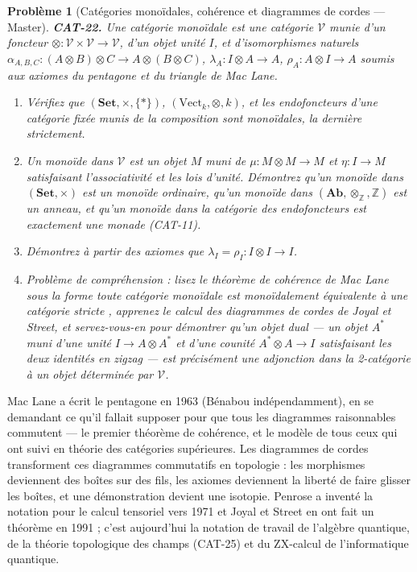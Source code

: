 \documentclass[11pt]{article}
\newtheorem{problem}{Problème}
\begin{document}
\begin{problem}[{Catégories monoïdales, cohérence et diagrammes de cordes --- Master}]
\textbf{CAT-22.} Une \textit{catégorie monoïdale} est une catégorie $ \mathcal{V} $ munie d'un
foncteur $ \otimes\colon \mathcal{V} \times \mathcal{V} \to \mathcal{V} $, d'un objet unité
$ I $, et d'isomorphismes naturels
$ \alpha_{A,B,C}\colon (A \otimes B) \otimes C \to A \otimes (B \otimes C) $,
$ \lambda_A\colon I \otimes A \to A $, $ \rho_A\colon A \otimes I \to A $ soumis aux axiomes
du pentagone et du triangle de Mac Lane.
\begin{enumerate}
\item[(a)] Vérifiez que $ (\mathbf{Set}, \times, \{*\}) $, $ (\mathrm{Vect}_k, \otimes, k) $, et
les endofoncteurs d'une catégorie fixée munis de la composition sont monoïdales, la dernière
strictement.
\item[(b)] Un \textit{monoïde} dans $ \mathcal{V} $ est un objet $ M $ muni de
$ \mu\colon M \otimes M \to M $ et $ \eta\colon I \to M $ satisfaisant l'associativité et les
lois d'unité. Démontrez qu'un monoïde dans $ (\mathbf{Set}, \times) $ est un monoïde ordinaire,
qu'un monoïde dans
$ (\mathbf{Ab}, \otimes_{\mathbb{Z}}, \mathbb{Z}) $ est un anneau, et qu'un monoïde dans la
catégorie des endofoncteurs est exactement une monade (CAT-11).
\item[(c)] Démontrez à partir des axiomes que $ \lambda_I = \rho_I\colon I \otimes I \to I $.
\item[(d)] Problème de compréhension : lisez le théorème de cohérence de Mac Lane sous la forme \og{} toute
catégorie monoïdale est monoïdalement équivalente à une catégorie stricte \fg{}, apprenez le calcul
des diagrammes de cordes de Joyal et Street, et servez-vous-en pour démontrer qu'un objet dual ---
un objet $ A^{*} $ muni d'une unité $ I \to A \otimes A^{*} $ et d'une counité
$ A^{*} \otimes A \to I $ satisfaisant les deux identités en zigzag --- est précisément une
adjonction dans la 2-catégorie à un objet déterminée par $ \mathcal{V} $.
\end{enumerate}

\end{problem}

\noindent Mac Lane a écrit le pentagone en 1963 (Bénabou indépendamment), en se demandant
ce qu'il fallait supposer pour que \og{} tous les diagrammes raisonnables commutent \fg{} --- le premier
théorème de cohérence, et le modèle de tous ceux qui ont suivi en théorie des catégories
supérieures. Les diagrammes de cordes transforment ces diagrammes commutatifs en topologie : les
morphismes deviennent des boîtes sur des fils, les axiomes deviennent la liberté de faire glisser
les boîtes, et une démonstration devient une isotopie. Penrose a inventé la notation pour le
calcul tensoriel vers 1971 et Joyal et Street en ont fait un théorème en 1991 ; c'est aujourd'hui
la notation de travail de l'algèbre quantique, de la théorie topologique des champs (CAT-25) et du
ZX-calcul de l'informatique quantique.
\end{document}
